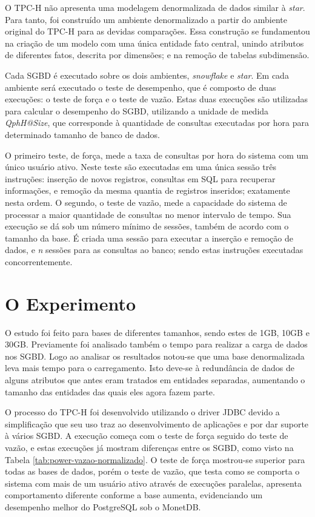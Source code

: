 \documentclass[12pt]{article}
\begin{document}
O TPC-H não apresenta uma modelagem denormalizada de dados similar à \textit{star}. Para tanto, foi construído 
um ambiente denormalizado a partir do ambiente original do TPC-H para as devidas comparações. 
Essa construção se fundamentou na criação de um modelo com 
uma única entidade fato central, unindo atributos de diferentes fatos, descrita por dimensões; e 
na remoção de tabelas subdimensão.

Cada SGBD é executado sobre os dois ambientes, \textit{snowflake} e \textit{star}.
Em cada ambiente será executado o teste de desempenho, que é composto de duas execuções: 
o teste de força e o teste de vazão. Estas duas execuções são utilizadas para calcular o 
desempenho do SGBD, utilizando a unidade de medida \textit{QphH@Size}, que corresponde à quantidade 
de consultas executadas por hora para determinado tamanho de banco de dados.

O primeiro teste, de força, mede a taxa de consultas por hora do sistema com um único usuário ativo. 
Neste teste são executadas em uma única sessão três instruções: inserção de novos registros, consultas 
em SQL para recuperar informações, e remoção da mesma quantia de registros inseridos; exatamente nesta ordem. O 
segundo, o teste de vazão, mede a capacidade do sistema de processar a maior quantidade de consultas no menor 
intervalo de tempo. Sua execução se dá sob um número mínimo de sessões, também de acordo com o tamanho 
da base. É criada uma sessão para executar a inserção e remoção de dados, e \textit{n} sessões para as consultas ao 
banco; sendo estas instruções executadas concorrentemente.

\section{O Experimento}

O estudo foi feito para bases de diferentes tamanhos, sendo estes de 1GB, 10GB e 30GB. Previamente foi analisado 
também o tempo para realizar a carga de dados nos SGBD. Logo ao analisar os resultados notou-se que uma base 
denormalizada leva mais tempo para o carregamento. Isto deve-se à redundância de dados de alguns atributos que 
antes eram tratados em entidades separadas, aumentando o tamanho das entidades das quais eles agora fazem parte.

O processo do TPC-H foi desenvolvido utilizando o driver JDBC devido a simplificação 
que seu uso traz ao desenvolvimento de aplicações e por dar suporte à vários SGBD. A 
execução começa com o teste de força seguido do teste de vazão, e estas execuções já 
mostram diferenças entre os SGBD, como visto na Tabela \ref{tab:power-vazao-normalizado}. O teste de força 
mostrou-se superior para todas as bases de dados, porém o teste de vazão, que testa 
como se comporta o sistema com mais de um usuário ativo através de execuções paralelas, 
apresenta comportamento diferente conforme a base aumenta, evidenciando um desempenho 
melhor do PostgreSQL sob o MonetDB.
\end{document}
